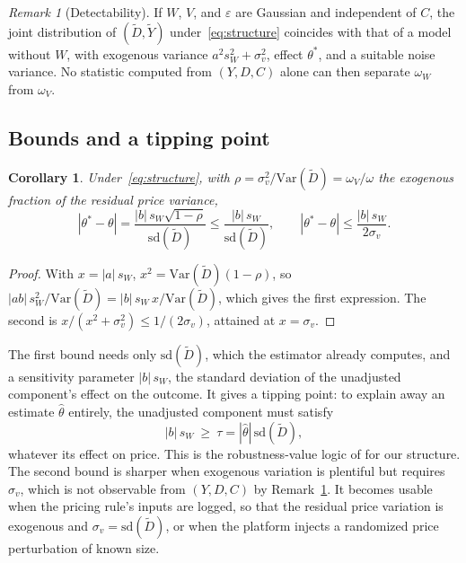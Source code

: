 \documentclass[11pt]{article}
\newtheorem{corollary}{Corollary}
\theoremstyle{remark}
\newtheorem{remark}{Remark}
\newcommand{\Var}{\mathrm{Var}}
\begin{document}
\begin{remark}[Detectability]
\label{rem:detect}
If $W$, $V$, and $\varepsilon$ are Gaussian and independent of $C$, the joint distribution of $(\tilde D, \tilde Y)$ under~\eqref{eq:structure} coincides with that of a model without $W$, with exogenous variance $a^2 s_W^2 + \sigma_v^2$, effect $\theta^\ast$, and a suitable noise variance. No statistic computed from $(Y, D, C)$ alone can then separate $\omega_W$ from $\omega_V$.
\end{remark}

\subsection{Bounds and a tipping point}

\begin{corollary}
\label{cor:bounds}
Under~\eqref{eq:structure}, with $\rho = \sigma_v^2 / \Var(\tilde D) = \omega_V / \omega$ the exogenous fraction of the residual price variance,
\begin{equation}
|\theta^\ast - \theta| = \frac{|b|\,s_W \sqrt{1 - \rho}}{\mathrm{sd}(\tilde D)} \le \frac{|b|\,s_W}{\mathrm{sd}(\tilde D)},
\qquad
|\theta^\ast - \theta| \le \frac{|b|\,s_W}{2\sigma_v}.
\label{eq:bounds}
\end{equation}
\end{corollary}

\begin{proof}
With $x = |a|\,s_W$, $x^2 = \Var(\tilde D)(1 - \rho)$, so $|ab|\,s_W^2 / \Var(\tilde D) = |b|\,s_W\,x / \Var(\tilde D)$, which gives the first expression. The second is $x / (x^2 + \sigma_v^2) \le 1 / (2\sigma_v)$, attained at $x = \sigma_v$.
\end{proof}

The first bound needs only $\mathrm{sd}(\tilde D)$, which the estimator already computes, and a sensitivity parameter $|b|\,s_W$, the standard deviation of the unadjusted component's effect on the outcome. It gives a tipping point: to explain away an estimate $\hat\theta$ entirely, the unadjusted component must satisfy
\begin{equation}
|b|\,s_W \ \ge\ \tau = |\hat\theta|\,\mathrm{sd}(\tilde D),
\label{eq:tipping}
\end{equation}
whatever its effect on price. This is the robustness-value logic of \citet{cinelli2020} for our structure. The second bound is sharper when exogenous variation is plentiful but requires $\sigma_v$, which is not observable from $(Y, D, C)$ by Remark~\ref{rem:detect}. It becomes usable when the pricing rule's inputs are logged, so that the residual price variation is exogenous and $\sigma_v = \mathrm{sd}(\tilde D)$, or when the platform injects a randomized price perturbation of known size.
\end{document}
